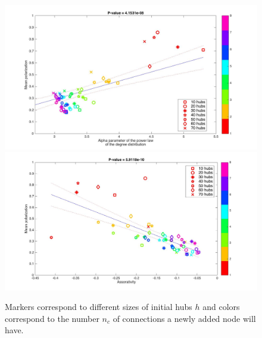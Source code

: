 \documentclass{article}
\begin{document}
\begin{figure}[]
\hspace{-1.5cm}
\includegraphics[scale=0.20]{img/reg1.jpg}
\hspace{-1.2cm} 
\includegraphics[scale=0.20]{img/reg7.jpg}
\caption{ Markers correspond to different sizes of initial hubs $h$ and colors correspond to the number $n_c$ of connections a newly added node will have.}
\label{reg1}
\end{figure}
\end{document}
